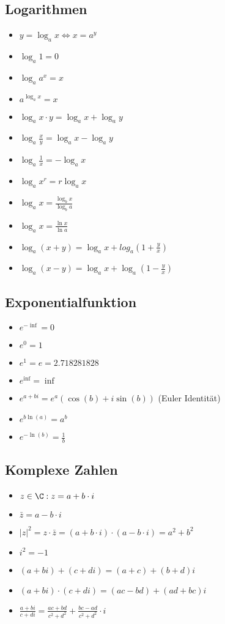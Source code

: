 \subsection{Logarithmen}
\begin{itemize}[leftmargin=*]
  \item $y = \log_a x \Leftrightarrow x = a^y$
  \item $\log_a 1 = 0$
  \item $\log_a a^x = x$
  \item $a^{\log_a x} = x $
  \item $\log_a x \cdot y = \log_a x + \log_a y$
  \item $\log_a \frac{x}{y} = \log_a x - \log_a y$
  \item $\log_a \frac{1}{x} = - \log_a x$
  \item $\log_a x^r = r \log_a x$
  \item $\log_a x = \frac{\log_b x}{\log_b a}$
  \item $\log_a x = \frac{\ln x}{\ln a}$
  \item $\log_a (x+y) = \log_a x + log_a (1 + \frac{y}{x})$
  \item $\log_a (x-y) = \log_a x + \log_a (1- \frac{y}{x})$
\end{itemize}

\subsection{Exponentialfunktion}
\begin{itemize}[leftmargin=*]
  \item $e^{-\inf} = 0$
  \item $e^0 = 1$
  \item $e^1 = e =  2.718281828$
  \item $e^{\inf} = \inf$
  \item $e^{a+bi} = e^a(\cos(b) + i \sin(b))$ (Euler Identität)
  \item $e^{b \ln(a)} = a^b$
  \item $ e^{-\ln(b)} = \frac{1}{b}$ 
\end{itemize}

\subsection{Komplexe Zahlen}
\begin{itemize}[leftmargin=*]
	\item $z \in \C: z = a + b\cdot i$
	\item $\bar{z} = a - b\cdot i$
	\item $|z|^2 = z \cdot \bar{z} = (a + b\cdot i) \cdot (a - b\cdot i) = a^2 + b^2$
	\item $i^2 = -1$
	\item $(a + bi) + (c + di) = (a + c) + (b + d)i$
	\item $(a + bi) \cdot (c + di) = (ac - bd) + (ad + bc)i$
	\item $\frac{a + bi}{c + di} = \frac{ac + bd}{c^2 + d^2} + \frac{bc - ad}{c^2 + d^2}\cdot i$
\end{itemize}
\pagebreak
